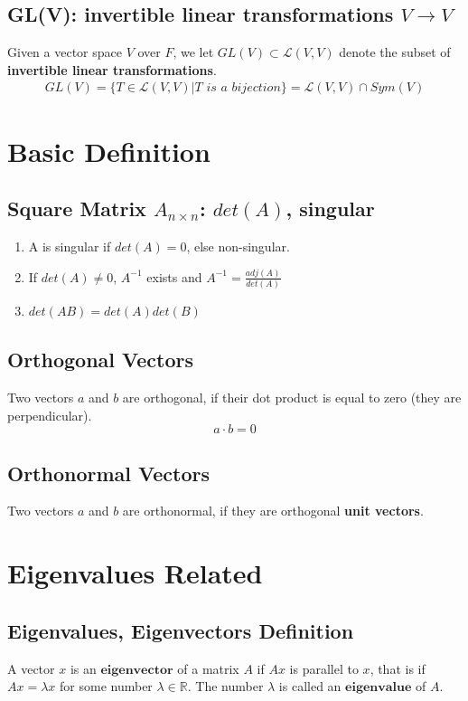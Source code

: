\documentclass[11pt,a4paper]{article}
\begin{document}
\subsection{GL(V): invertible linear transformations $V \rightarrow	V$}
Given a vector space $V$ over $F$, we let $GL(V ) \subset \mathcal{L}(V , V )$ denote the subset of \textbf{invertible linear transformations}.
\begin{equation}
    \begin{aligned}
        GL(V)=\{T\in \mathcal{L}(V , V )| T \textit{ is a bijection}\}=\mathcal{L}(V , V )\cap Sym(V)
    \end{aligned}
    \nonumber
\end{equation}

\section{Basic Definition}
\subsection{Square Matrix $A_{n\times n}$: $det(A)$, singular}
\begin{enumerate}
    \item A is singular if $det(A)=0$, else non-singular.
    \item If $det(A)\neq 0$, $A^{-1}$ exists and $A^{-1}=\frac{adj(A)}{det(A)}$
    \item $det(AB)=det(A)det(B)$
\end{enumerate}

\subsection{Orthogonal Vectors}
Two vectors $a$ and $b$ are orthogonal, if their dot product is equal to zero (they are perpendicular). $$a\cdot b=0$$

\subsection{Orthonormal Vectors}
Two vectors $a$ and $b$ are orthonormal, if they are orthogonal \textbf{unit vectors}.





\section{Eigenvalues Related}
\subsection{Eigenvalues, Eigenvectors Definition}
A vector $x$ is an $\textbf{eigenvector}$ of a matrix $A$ if $Ax$ is parallel to $x$, that is if $Ax = \lambda x$ for some number $\lambda\in \mathbb{R}$. The number $\lambda$ is called an $\textbf{eigenvalue}$ of $A$.
\end{document}
